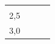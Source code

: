 {\begin{tabular}[t]{|l|l|l|l|}
         &
    
    
     \tabularnewline\cline{1-1}\cline{2-2}\cline{3-3}\cline{4-4}
    
    
        2,5 &
    
    
         &
    
    
         &
    
    
     \tabularnewline\cline{1-1}\cline{2-2}\cline{3-3}\cline{4-4}
    
    
        3,0 &
    
    
         &
    
    
         &
    
    
     \tabularnewline\cline{1-1}\cline{2-2}\cline{3-3}\cline{4-4}
    \end{tabular}} %
